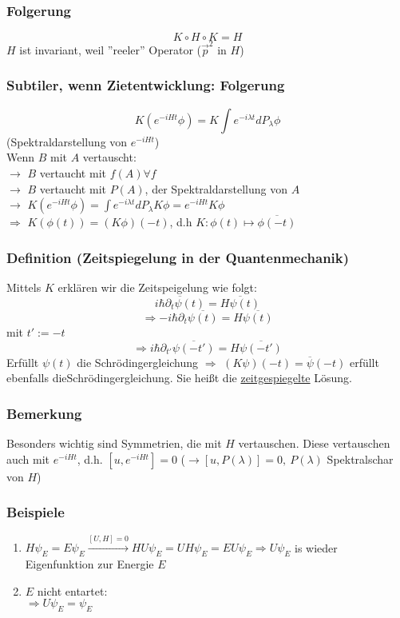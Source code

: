 \documentclass[twoside,a4paper]{scrartcl}
\renewcommand{\1}{\mathds{1}}
\newcommand{\Ra}{\Rightarrow}
\newcommand{\ra}{\rightarrow}
\renewcommand{\l}{\lambda}
\begin{document}
\subsubsection*{Folgerung}
$$K \circ H \circ K = H$$
$H$ ist invariant, weil ''reeler'' Operator ($\vec p^2$ in $H$)
\subsubsection*{Subtiler, wenn Zietentwicklung: Folgerung}
$$K(e^{-iHt}\phi)=K\int e^{-i\l t} dP_\l \phi$$
(Spektraldarstellung von $e^{-iHt}$)\\
Wenn $B$ mit $A$ vertauscht:\\
$\ra$ $B$ vertaucht mit $f(A) \forall f$\\
$\ra$ $B$ vertaucht mit $P(A)$, der Spektraldarstellung von $A$\\
$\ra$ $K(e^{-iHt}\phi)=\int e^{-i\l t} dP_\l K\phi=e^{-iHt}K\phi$\\
$\Ra$ $K(\phi(t))=(K\phi)(-t)$, d.h $K: \phi(t) \mapsto \overline{\phi(-t)}$
\subsubsection*{Definition (Zeitspiegelung in der Quantenmechanik)}
Mittels $K$ erklären wir die Zeitspeigelung wie folgt:
$$\overline{i \hbar \partial_t \psi(t)}=\overline{H\psi(t)}$$
$$\Ra -i\hbar \partial_t \overline{\psi(t)}=H \overline{\psi(t)}$$
mit $t':=-t$
$$\Ra i \hbar \partial_{t'}\overline{\psi(-t')}=H\overline{\psi(-t')}$$
Erfüllt $\psi(t)$ die Schrödingergleichung $\Ra$ $(K\psi)(-t)=\overline{\psi}(-t)$ erfüllt ebenfalls dieSchrödingergleichung. Sie heißt die \underline{zeitgespiegelte} Lösung.
\subsubsection*{Bemerkung}
Besonders wichtig sind Symmetrien, die mit $H$ vertauschen. Diese vertauschen auch mit $e^{-iHt}$, d.h. $[u, e^{-iHt}]=0$ ($\ra [u,P(\l)]=0, \ P(\l)$ Spektralschar von $H$)
\subsubsection*{Beispiele}
\begin{enumerate}
\item $H\psi_E=E \psi_E \stackrel{[U,H]=0}{\ra} HU\psi_E=UH\psi_E=EU\psi_E \Ra U \psi_E$ is wieder Eigenfunktion zur Energie $E$
\item $E$ nicht entartet:\\
$\Ra U \psi_E=\psi_E$
\end{enumerate}
\end{document}
